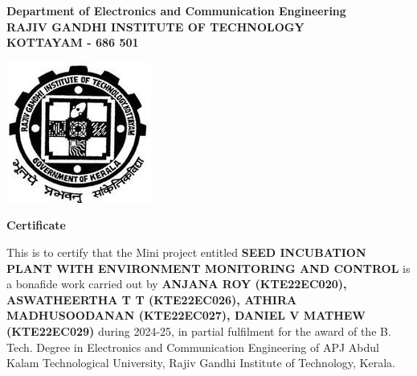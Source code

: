 \begin{center}

    {
        \large \bfseries
        Department of Electronics and Communication Engineering \\
        \vspace{10pt}
        RAJIV GANDHI INSTITUTE OF TECHNOLOGY \\
        \vspace{5pt}
        KOTTAYAM - 686 501 \\
        \vspace{5pt}
    }

    \vspace{50pt}

    \includegraphics {clg_logo.jpg}

    \vspace{40pt}

    {
        \huge \bfseries
        Certificate
    }

    \vspace{40pt}

    \begin{minipage} {0.9\textwidth}
        {
            \large
            This is to certify that the Mini project entitled
            \textbf{SEED INCUBATION PLANT WITH ENVIRONMENT MONITORING AND CONTROL}
            is a bonafide work carried out by
            \textbf{
                ANJANA ROY (KTE22EC020),
                ASWATHEERTHA T T (KTE22EC026),
                ATHIRA MADHUSOODANAN (KTE22EC027),
                DANIEL V MATHEW (KTE22EC029)
            }
            during 2024-25, in partial
            fulfilment for the award of the B. Tech. Degree in Electronics and
            Communication Engineering of APJ Abdul Kalam Technological
            University, Rajiv Gandhi Institute of Technology, Kerala.
        }
    \end{minipage}

    \vspace{30pt}


\end{center}
